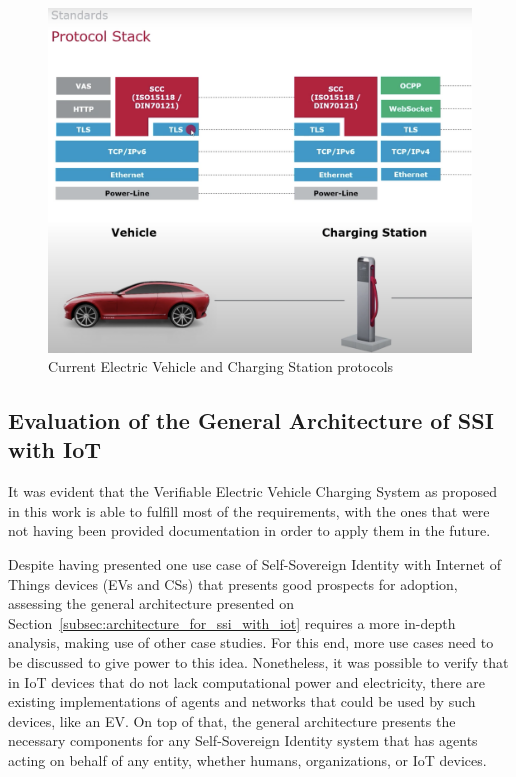 \begin{figure}[!htb]
    \centering
    \includegraphics[width=0.6\linewidth]{images/EV_CS_Protocols.png}
    \caption[Current Electric Vehicle and Charging Station protocols]{Current Electric Vehicle and Charging Station protocols \protect \footnotemark}
    \label{fig:ev_cs_protocols}
\end{figure}


\subsection{Evaluation of the General Architecture of SSI with IoT}
\label{subsec:evaluation_of_the_general_architecture}

It was evident that the Verifiable Electric Vehicle Charging System as proposed in this work is able to fulfill most of the requirements, with the ones that were not having been provided documentation in order to apply them in the future.

Despite having presented one use case of Self-Sovereign Identity with Internet of Things devices (EVs and CSs) that presents good prospects for adoption, assessing the general architecture presented on Section~\ref{subsec:architecture_for_ssi_with_iot} requires a more in-depth analysis, making use of other case studies. For this end, more use cases need to be discussed to give power to this idea. Nonetheless, it was possible to verify that in IoT devices that do not lack computational power and electricity, there are existing implementations of agents and networks that could be used by such devices, like an EV. On top of that, the general architecture presents the necessary components for any Self-Sovereign Identity system that has agents acting on behalf of any entity, whether humans, organizations, or IoT devices.

